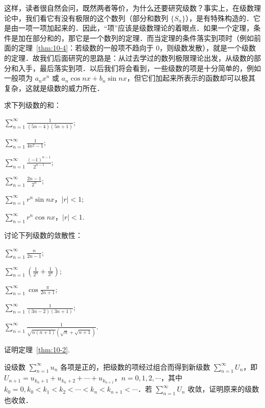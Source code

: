 这样，读者很自然会问，既然两者等价，为什么还要研究级数？事实上，在级数理论中，我们看它有没有极限的这个数列（部分和数列 $\{S_{n}\}$），是有特殊构造的．它是由一项一项加起来的．因此，``项''应该是级数理论的着眼点．如果一个定理，条件是加在部分和的，那它是一个数列的定理．而当定理的条件落实到项时（例如前面的定理~\ref{thm:10-4}：若级数的一般项不趋向于 $0$，则级数发散），就是一个级数的定理．故我们后面研究的思路是：从过去学过的数列极限理论出发，从级数的部分和入手，最后落实到项．以后我们将会看到，一些级数的项是十分简单的，例如一般项为 $a_{n}x^{n}$ 或 $a_{n}\cos nx+b_{n}\sin nx$，但它们加起来所表示的函数却可以极其复杂，这就是级数的威力所在．

\begin{xiti}
\item 求下列级数的和：
\begin{ziti}
\item $\displaystyle\sum_{n=1}^{\infty}\frac{1}{(5n-4)(5n+1)}$;
\item $\displaystyle\sum_{n=1}^{\infty}\frac{1}{4n^{2}-1}$;
\item $\displaystyle\sum_{n=1}^{\infty}\frac{(-1)^{n-1}}{2^{n-1}}$;
\item $\displaystyle\sum_{n=1}^{\infty}\frac{2n-1}{2^{n}}$;
\item $\displaystyle\sum_{n=1}^{\infty}r^{n}\sin nx$，$|r|<1$;
\item $\displaystyle\sum_{n=1}^{\infty}r^{n}\cos nx$，$|r|<1$.
\end{ziti}
\item 讨论下列级数的敛散性：
\begin{ziti}
\item $\displaystyle\sum_{n=1}^{\infty}\frac{n}{2n-1}$;
\item $\displaystyle\sum_{n=1}^{\infty}\left(\frac{1}{2^{n}}+\frac{1}{3^{n}}\right)$;
\item $\displaystyle\sum_{n=1}^{\infty}\cos\frac{\pi}{2n+1}$;
\item $\displaystyle\sum_{n=1}^{\infty}\frac{1}{(3n-2)(3n+1)}$;
\item $\displaystyle\sum_{n=1}^{\infty}\frac{1}{\sqrt{n(n+1)}(\sqrt{n}+\sqrt{n+1})}$.
\end{ziti}
\item 证明定理~\ref{thm:10-2}.
\item 设级数 $\sum_{n=1}^{\infty}u_{n}$ 各项是正的，把级数的项经过组合而得到新级数 $\sum_{n=1}^{\infty}U_{n}$，即 $U_{n+1}=u_{k_{n}+1}+u_{k_{n}+2}+\cdots+u_{k_{n+1}}$，$n=0,1,2,\cdots$，其中 $k_{0}=0,k_{0}<k_{1}<k_{2}<\cdots<k_{n}<k_{n+1}<\cdots$．若 $\sum_{n=1}^{\infty}U_{n}$ 收敛，证明原来的级数也收敛．
\end{xiti}


